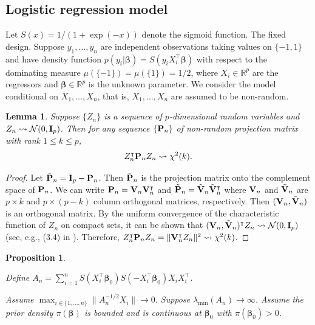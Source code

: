 \documentclass[11pt]{article}
\newcommand{\myT}{\intercal}
\newcommand{\bfsym}[1]{\ensuremath{\boldsymbol{#1}}}
\def\bbeta{\bfsym \beta}
\theoremstyle{plain}
\newtheorem{proposition}{\quad\quad Proposition}
\newtheorem{lemma}{\quad\quad Lemma}
\theoremstyle{definition}
\theoremstyle{remark}
\begin{document}
\subsection{Logistic regression model}\label{sec:logistic}

Let $S(x) = 1/(1+\exp(-x))$ denote the sigmoid function.
The fixed design.
Suppose $y_1, \dots, y_n$ are independent observations taking values on $\{-1,1\}$ and have density function
    $p(y_i | \bbeta) = S(y_i X_i^\myT \bbeta)$
    with respect to the dominating measure $\mu(\{-1\}) = \mu(\{1\}) = 1/2$, where $X_i \in \mathbb R^p$ are the regressors and $\bbeta \in \mathbb R^p$ is the unknown parameter.
    We consider the model conditional on $X_1,\dots,X_n$, that is, $X_1, \dots, X_n$ are assumed to be non-random.


\begin{lemma}
    \label{lemma:invariance}
    Suppose $\{Z_n\}$ is a sequence of $p$-dimensional random variables and $Z_n \rightsquigarrow \mathcal N (0, \mathbf{I}_p)$.
    Then for any sequence $\{\mathbf{P}_n\}$ of non-random projection matrix with rank $1\leq k \leq p$,
    \begin{align*}
    Z_n^\myT \BP_n Z_n \rightsquigarrow \chi^2(k).
    \end{align*}
\end{lemma}
\begin{proof}
    Let $\tilde {\mathbf{P}}_n = \mathbf{I}_p - \mathbf{P}_n$.
    Then $\tilde {\mathbf{P}}_n$ is the projection matrix onto the complement space of $\mathbf{P}_n$.
    We can write $\BP_n = \BV_n \BV_n^\myT$ and $\tilde \BP_n = \tilde \BV_n \tilde \BV_n^\myT$ where $\mathbf{V}_n$ and $\tilde {\mathbf{V}}_n$ are $p\times k$ and $p\times (p-k)$ column orthogonal matrices, respectively.
    Then $(\mathbf{V}_n , \tilde {\mathbf{V}}_n)$ is an orthogonal matrix.
By the uniform convergence of the characteristic function of $Z_n$ on compact sets, it can be shown that $(\BV_n, \tilde \BV_n)^\myT Z_n \rightsquigarrow \mathcal N (0, \BI_p)$ (see, e.g., (3.4) in \cite{Fahrmeir_1985}).
Therefore, $
    Z_n^\myT \BP_n Z_n
    =
    \|\BV_n^\myT Z_n\|^2
    \rightsquigarrow \chi^2(k)
    $.
\end{proof}


\begin{proposition}
    \label{prop:logistic}

    Define $
 A_n = 
    \sum_{i=1}^n 
    S( X_i^\myT \bbeta_0)
    S(- X_i^\myT \bbeta_0)
    X_i
    X_i^\myT $.

    Assume 
$
     \max_{i\in \{1,\dots,n\}}
 \|A_n^{-1/2}
 X_i\| \to 0.
$
Suppose $\lambda_{\min}(A_n) \to \infty$.
Assume the prior density $\pi(\bbeta)$ is bounded and is continuous at $\bbeta_0$ with $\pi(\bbeta_0)> 0$.
\end{proposition}
\end{document}
